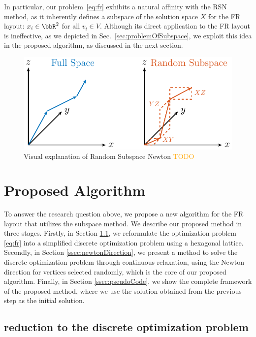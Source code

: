\documentclass[dvipdfmx,journal]{IEEEtran}
\newcommand{\orange}[1]{\textcolor{orange}{#1}}
\begin{document}
In particular, our problem~\eqref{eq:fr} exhibits a natural affinity with the RSN method, as it inherently defines a subspace of the solution space $X$ for the FR layout: $x_i \in \bbR^2$ for all $v_i \in V$.
Although its direct application to the FR layout is ineffective, as we depicted in Sec.~\ref{sec:problemOfSubspace}, we exploit this idea in the proposed algorithm, as discussed in the next section.

\begin{figure}[t]
  \centering
  \includegraphics[width=\columnwidth]{randomSubspace/randomSubspace.pdf}
  \caption{
    Visual explanation of Random Subspace Newton
    \orange{TODO}
  }
  \label{fig:randomSubspace}
\end{figure}

\section{Proposed Algorithm}\label{sec:algorithm}

To answer the research question above, we propose a new algorithm for the FR layout that utilizes the subspace method.
We describe our proposed method in three stages.
Firstly, in Section \ref{ssec:reduction}, we reformulate the optimization problem \eqref{eq:fr} into a simplified discrete optimization problem using a hexagonal lattice.
Secondly, in Section \ref{ssec:newtonDirection}, we present a method to solve the discrete optimization problem through continuous relaxation, using the Newton direction for vertices selected randomly, which is the core of our proposed algorithm.
Finally, in Section \ref{ssec:pseudoCode}, we show the complete framework of the proposed method, where we use the solution obtained from the previous step as the initial solution.

\subsection{reduction to the discrete optimization problem}\label{ssec:reduction}
\end{document}
